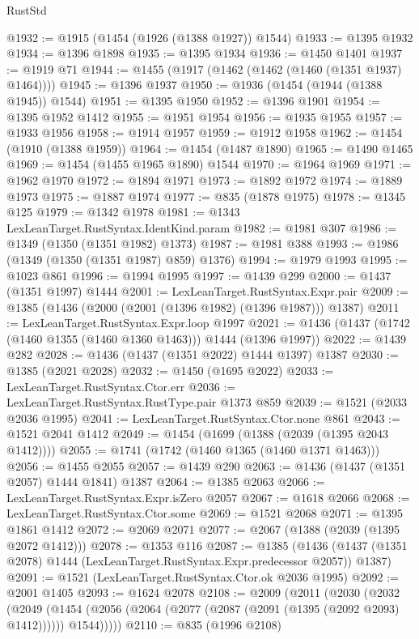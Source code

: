 \begin{lexlean}{RustStd}
\begin{coremodule}
@1932 := @1915 (@1454 (@1926 (@1388 @1927)) @1544)
@1933 := @1395 @1932
@1934 := @1396 @1898
@1935 := @1395 @1934
@1936 := @1450 @1401
@1937 := @1919 @71
@1944 := @1455 (@1917 (@1462 (@1462 (@1460 (@1351 @1937) @1464))))
@1945 := @1396 @1937
@1950 := @1936 (@1454 (@1944 (@1388 @1945)) @1544)
@1951 := @1395 @1950
@1952 := @1396 @1901
@1954 := @1395 @1952 @1412
@1955 := @1951 @1954
@1956 := @1935 @1955
@1957 := @1933 @1956
@1958 := @1914 @1957
@1959 := @1912 @1958
@1962 := @1454 (@1910 (@1388 @1959))
@1964 := @1454 (@1487 @1890)
@1965 := @1490 @1465
@1969 := @1454 (@1455 @1965 @1890) @1544
@1970 := @1964 @1969
@1971 := @1962 @1970
@1972 := @1894 @1971
@1973 := @1892 @1972
@1974 := @1889 @1973
@1975 := @1887 @1974
@1977 := @835 (@1878 @1975)
@1978 := @1345 @125
@1979 := @1342 @1978
@1981 := @1343 LexLeanTarget.RustSyntax.IdentKind.param
@1982 := @1981 @307
@1986 := @1349 (@1350 (@1351 @1982) @1373)
@1987 := @1981 @388
@1993 := @1986 (@1349 (@1350 (@1351 @1987) @859) @1376)
@1994 := @1979 @1993
@1995 := @1023 @861
@1996 := @1994 @1995
@1997 := @1439 @299
@2000 := @1437 (@1351 @1997) @1444
@2001 := LexLeanTarget.RustSyntax.Expr.pair
@2009 := @1385 (@1436 (@2000 (@2001 (@1396 @1982) (@1396 @1987))) @1387)
@2011 := LexLeanTarget.RustSyntax.Expr.loop @1997
@2021 := @1436 (@1437 (@1742 (@1460 @1355 (@1460 @1360 @1463))) @1444 (@1396 @1997))
@2022 := @1439 @282
@2028 := @1436 (@1437 (@1351 @2022) @1444 @1397) @1387
@2030 := @1385 (@2021 @2028)
@2032 := @1450 (@1695 @2022)
@2033 := LexLeanTarget.RustSyntax.Ctor.err
@2036 := LexLeanTarget.RustSyntax.RustType.pair @1373 @859
@2039 := @1521 (@2033 @2036 @1995)
@2041 := LexLeanTarget.RustSyntax.Ctor.none @861
@2043 := @1521 @2041 @1412
@2049 := @1454 (@1699 (@1388 (@2039 (@1395 @2043 @1412))))
@2055 := @1741 (@1742 (@1460 @1365 (@1460 @1371 @1463)))
@2056 := @1455 @2055
@2057 := @1439 @290
@2063 := @1436 (@1437 (@1351 @2057) @1444 @1841) @1387
@2064 := @1385 @2063
@2066 := LexLeanTarget.RustSyntax.Expr.isZero @2057
@2067 := @1618 @2066
@2068 := LexLeanTarget.RustSyntax.Ctor.some
@2069 := @1521 @2068
@2071 := @1395 @1861 @1412
@2072 := @2069 @2071
@2077 := @2067 (@1388 (@2039 (@1395 @2072 @1412)))
@2078 := @1353 @116
@2087 := @1385
    (@1436 (@1437 (@1351 @2078) @1444 (LexLeanTarget.RustSyntax.Expr.predecessor @2057)) @1387)
@2091 := @1521 (LexLeanTarget.RustSyntax.Ctor.ok @2036 @1995)
@2092 := @2001 @1405
@2093 := @1624 @2078
@2108 := @2009
    (@2011
      (@2030
        (@2032
          (@2049
            (@1454 (@2056 (@2064 (@2077 (@2087 (@2091 (@1395 (@2092 @2093) @1412)))))) @1544)))))
@2110 := @835 (@1996 @2108)

\end{coremodule}
\end{lexlean}
